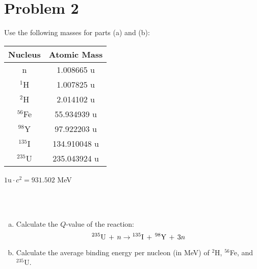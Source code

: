 \section*{Problem 2}

Use the following masses for parts (a) and (b):

\begin{table}[htbp]
	\centering
	\begin{tabular}{|c|c|}
			\hline
			Nucleus		&	Atomic Mass \\
			\hline
			n 			&	 1.008665 u \\
			$^{1}$H		& 	 1.007825 u \\
			$^{2}$H 	&	 2.014102 u \\
			$^{56}$Fe	&   55.934939 u \\
			$^{98}$Y 	&   97.922203 u \\
			$^{135}$I	&  134.910048 u \\
			$^{235}$U	&  235.043924 u \\
			\hline
	\end{tabular}
	\label{tab:design-specs}
\end{table}
\begin{center}$1\text{u} \cdot c^{2} = 931.502$ MeV\end{center}
\-\\
\-\\
\begin{enumerate}[a)]
\item Calculate the $Q$-value of the reaction:
$$ ^{235}\text{U}\, + \,n \-\rightarrow\- ^{135}\text{I}\, + \,^{98}\text{Y}\, + \,3n $$
\item Calculate the average binding energy per nucleon (in MeV) of $^{2}$H, $^{56}$Fe, and $^{235}$U.

\end{enumerate}

